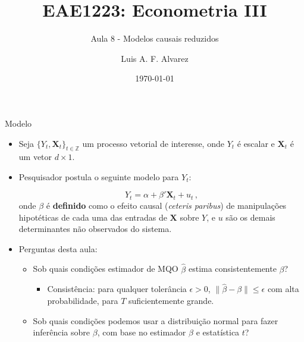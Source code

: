 \documentclass[11pt]{beamer}
\author{Luis A. F. Alvarez}
\title{EAE1223: Econometria III}
\subtitle{Aula 8 - Modelos causais reduzidos}
\date{\today}
\begin{document}
\begin{frame}[plain]
	\maketitle
\end{frame}

\begin{frame}{Modelo}
	\begin{itemize}
		\item 	Seja $\{Y_t, \boldsymbol{X}_t\}_{t\in \mathbb{Z}}$ um processo vetorial de interesse, onde $Y_t$ é escalar e $\boldsymbol{X}_t$ é um vetor $d \times 1$.
		\item Pesquisador postula o seguinte modelo para $Y_t$:
		
		\begin{equation}
			\label{eq_structural}
			Y_t = \alpha + \beta ' \boldsymbol{X}_t + u_t\, ,
		\end{equation}
		onde $\beta$ é \textbf{definido} como o efeito causal (\textit{ceteris paribus}) de manipulações hipotéticas de cada uma das entradas de $\boldsymbol{X}$ sobre $Y$, e $u$ são os demais determinantes não observados do sistema.
		\item Perguntas desta aula:
		\begin{itemize}
			\item Sob quais condições estimador de MQO $\hat\beta$ estima consistentemente $\beta$?
			\begin{itemize}
				\item Consistência: para qualquer tolerância $\epsilon > 0$, $\lVert \hat \beta- \beta \rVert \leq \epsilon$ com alta probabilidade, para $T$ suficientemente grande.
			\end{itemize}
			\item Sob quais condições podemos usar a distribuição normal para fazer inferência sobre $\beta$, com base no estimador $\hat \beta$ e estatística $t$?
		\end{itemize}
	\end{itemize}

\end{frame}
\end{document}

